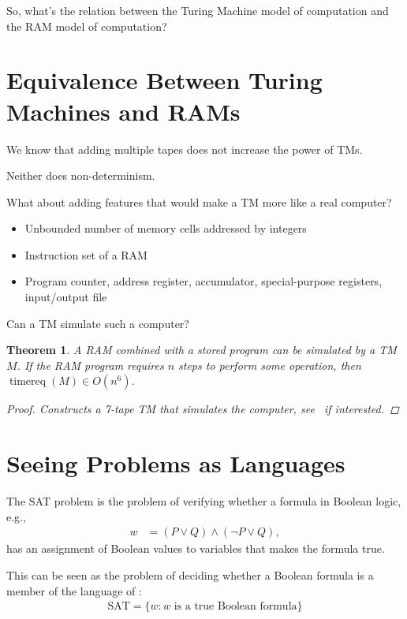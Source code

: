 \documentclass[a4paper]{report}
\newtheorem{theo}{Theorem}
\newcommand{\bookref}[3]{\marginpar{\faBook{}~#1\\Chapter #2\\Section #3}}
\theoremstyle{definition}
\DeclareMathOperator*{\treq}{timereq}
\begin{document}
So, what's the relation between the Turing Machine model of computation and the RAM model of computation?

\section{Equivalence Between Turing Machines and RAMs}
\bookref{ER}{17}{17.4}
We know that adding multiple tapes does not increase the power of TMs.

Neither does non-determinism.

What about adding features that would make a TM more like a real computer?

\begin{itemize}
\item Unbounded number of memory cells addressed by integers
\item Instruction set of a RAM
\item Program counter, address register, accumulator, special-purpose registers, input/output file
\end{itemize}

Can a TM simulate such a computer?

\begin{theo}
A RAM combined with a stored program can be simulated by a TM $M$. If the RAM program requires $n$ steps to perform some operation, then $\treq(M) \in O(n^6)$.
\begin{proof}
Constructs a 7-tape TM that simulates the computer, see~\citep{rich2008automata} if interested.
\end{proof}
\end{theo}

\section{Seeing Problems as Languages}
\bookref{ER}{17}{17.2}
The SAT problem is the problem of verifying whether a formula in Boolean logic, e.g.,
%
\begin{align*}
w &= (P \vee Q) \wedge (\neg P \vee Q),
\end{align*}
%
has an assignment of Boolean values to variables that makes the formula true.

This can be seen as the problem of deciding whether a Boolean formula is a member of the language of :
%
\begin{align*}
\text{SAT} = \{ w : w \;\text{is a true Boolean formula} \}
\end{align*}
%
\end{document}
